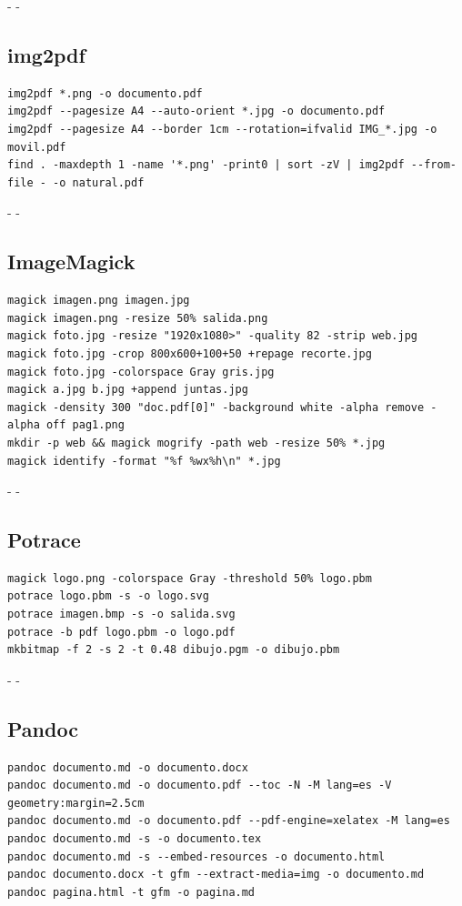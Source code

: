 \documentclass[11pt,a4paper]{article}
\makeatletter
\newcommand{\necesitaespacio}[1]{\par\penalty-100\begingroup
	\setlength{\dimen@}{#1}\dimen@ii\pagegoal\advance\dimen@ii-\pagetotal
	\ifdim\dimen@>\dimen@ii\ifdim\dimen@ii>\z@\vfil\fi\penalty-\@M\fi\endgroup}
\makeatother
\begin{document}
	\necesitaespacio{8\baselineskip}
	\subsection*{img2pdf}
	\begin{lstlisting}
img2pdf *.png -o documento.pdf
img2pdf --pagesize A4 --auto-orient *.jpg -o documento.pdf
img2pdf --pagesize A4 --border 1cm --rotation=ifvalid IMG_*.jpg -o movil.pdf
find . -maxdepth 1 -name '*.png' -print0 | sort -zV | img2pdf --from-file - -o natural.pdf
\end{lstlisting}
	
	\necesitaespacio{8\baselineskip}
	\subsection*{ImageMagick}
	\begin{lstlisting}
magick imagen.png imagen.jpg
magick imagen.png -resize 50% salida.png
magick foto.jpg -resize "1920x1080>" -quality 82 -strip web.jpg
magick foto.jpg -crop 800x600+100+50 +repage recorte.jpg
magick foto.jpg -colorspace Gray gris.jpg
magick a.jpg b.jpg +append juntas.jpg
magick -density 300 "doc.pdf[0]" -background white -alpha remove -alpha off pag1.png
mkdir -p web && magick mogrify -path web -resize 50% *.jpg
magick identify -format "%f %wx%h\n" *.jpg
\end{lstlisting}
	
	\necesitaespacio{8\baselineskip}
	\subsection*{Potrace}
	\begin{lstlisting}
magick logo.png -colorspace Gray -threshold 50% logo.pbm
potrace logo.pbm -s -o logo.svg
potrace imagen.bmp -s -o salida.svg
potrace -b pdf logo.pbm -o logo.pdf
mkbitmap -f 2 -s 2 -t 0.48 dibujo.pgm -o dibujo.pbm
\end{lstlisting}
	
	\necesitaespacio{8\baselineskip}
	\subsection*{Pandoc}
	\begin{lstlisting}
pandoc documento.md -o documento.docx
pandoc documento.md -o documento.pdf --toc -N -M lang=es -V geometry:margin=2.5cm
pandoc documento.md -o documento.pdf --pdf-engine=xelatex -M lang=es
pandoc documento.md -s -o documento.tex
pandoc documento.md -s --embed-resources -o documento.html
pandoc documento.docx -t gfm --extract-media=img -o documento.md
pandoc pagina.html -t gfm -o pagina.md
\end{lstlisting}
	
\end{document}

